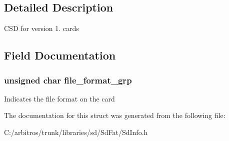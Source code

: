 \subsection{Detailed Description}
C\-S\-D for version 1. cards 

\subsection{Field Documentation}
\hypertarget{struct_c_s_d_v1_aa44f7b6ef5fd710a716fa9ef045c68f0}{
\subsubsection[{file\-\_\-format\-\_\-grp}]{\setlength{\rightskip}{0pt plus 5cm}unsigned char file\-\_\-format\-\_\-grp}}\label{struct_c_s_d_v1_aa44f7b6ef5fd710a716fa9ef045c68f0}
Indicates the file format on the card 

The documentation for this struct was generated from the following file\-:\begin{DoxyCompactItemize}
\item 
C\-:/arbitros/trunk/libraries/sd/\-Sd\-Fat/Sd\-Info.\-h\end{DoxyCompactItemize}
